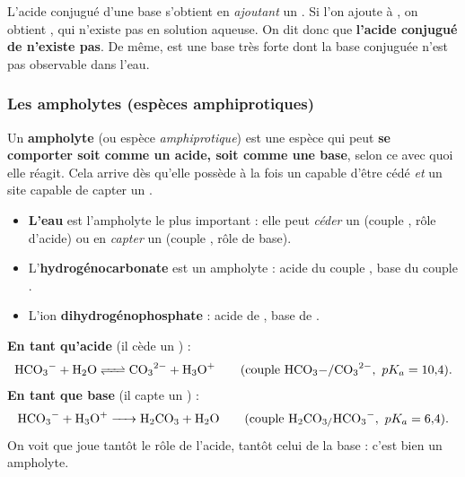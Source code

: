 \documentclass[11pt,a4paper]{article}
\begin{document}
\begin{attention}
L'acide conjugué d'une base s'obtient en \emph{ajoutant} un . Si l'on ajoute  à , on
obtient , qui n'existe pas en solution aqueuse. On dit donc que \textbf{l'acide conjugué de
 n'existe pas}. De même,  est une base très forte dont la base conjuguée n'est pas
observable dans l'eau.
\end{attention}

\subsubsection{Les ampholytes (espèces amphiprotiques)}

\begin{definition}[ampholyte]
Un \textbf{ampholyte} (ou espèce \emph{amphiprotique}) est une espèce qui peut \textbf{se comporter soit
comme un acide, soit comme une base}, selon ce avec quoi elle réagit. Cela arrive dès qu'elle possède à la
fois un  capable d'être cédé \emph{et} un site capable de capter un .
\end{definition}

\begin{exemple}
\begin{itemize}[leftmargin=1.6em,topsep=2pt,itemsep=2pt]
  \item \textbf{L'eau } est l'ampholyte le plus important : elle peut \emph{céder} un  (couple
        , rôle d'acide) ou en \emph{capter} un (couple , rôle de base).
  \item L'\textbf{hydrogénocarbonate } est un ampholyte : acide du couple
        , base du couple .
  \item L'ion \textbf{dihydrogénophosphate } : acide de , base de
        .
\end{itemize}
\end{exemple}

\begin{exemple}
\textbf{En tant qu'acide} (il cède un ) :
\[ \ce{HCO3- + H2O <=> CO3^{2-} + H3O+} \qquad (\text{couple } \ce{HCO3-/CO3^{2-}},\ pK_a = 10{,}4). \]
\textbf{En tant que base} (il capte un ) :
\[ \ce{HCO3- + H3O+ -> H2CO3 + H2O} \qquad (\text{couple } \ce{H2CO3/HCO3-},\ pK_a = 6{,}4). \]
On voit que  joue tantôt le rôle de l'acide, tantôt celui de la base : c'est bien un ampholyte.
\end{exemple}
\end{document}
